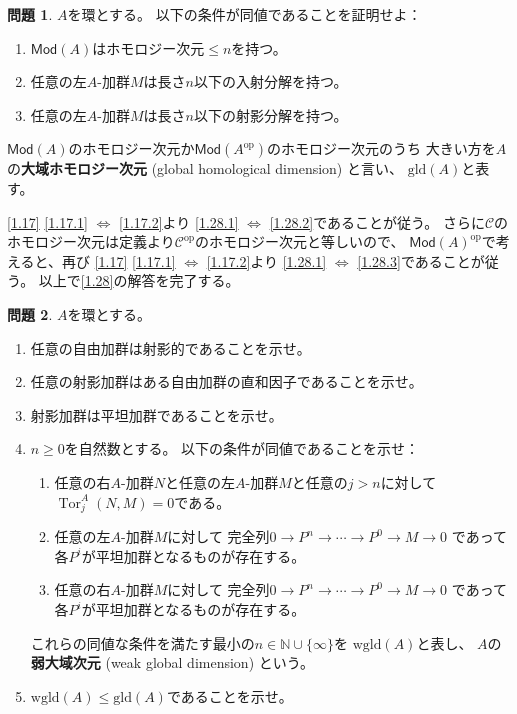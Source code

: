 \documentclass[uplatex,dvipdfmx]{jsarticle}
\makeatletter
\theoremstyle{definition}
\newtheorem{prob}[prob]{問題}
\renewenvironment{proof}[1][\proofname]{
  \pushQED{\qed}%
  \normalfont \topsep6\p@\@plus6\p@\relax
  \trivlist
  \item[\hskip\labelsep
    #1\@addpunct{\textbf{.}}]\ignorespaces
}{%
  \popQED\endtrivlist\@endpefalse
}
\providecommand{\proofname}{証明}
\newcommand{\op}{\mathrm{op}}
\DeclareMathOperator{\Tor}{\mathrm{Tor}}
\newcommand{\Mod}{\mathsf{Mod}}
\newcommand\N{\mathbb{N}}
\newcommand\mcC{\mathcal{C}}
\newcommand{\gld}{\mathrm{gld}}
\newcommand{\wgld}{\mathrm{wgld}}
\makeatother
\begin{document}
\begin{prob}\label{1.28}
  \(A\)を環とする。
  以下の条件が同値であることを証明せよ：
  \begin{enumerate}
    \item \label{1.28.1}
    \(\Mod(A)\)はホモロジー次元\(\leq n\)を持つ。
    \item \label{1.28.2}
    任意の左\(A\)-加群\(M\)は長さ\(n\)以下の入射分解を持つ。
    \item \label{1.28.3}
    任意の左\(A\)-加群\(M\)は長さ\(n\)以下の射影分解を持つ。
  \end{enumerate}
  \(\Mod(A)\)のホモロジー次元か\(\Mod(A^{\op})\)のホモロジー次元のうち
  大きい方を\(A\)の\textbf{大域ホモロジー次元}
  (global homological dimension) と言い、
  \(\gld(A)\)と表す。
\end{prob}

\begin{proof}
  \autoref{1.17} \ref{1.17.1} \(\iff\) \ref{1.17.2}より
  \ref{1.28.1} \(\iff\) \ref{1.28.2}であることが従う。
  さらに\(\mcC\)のホモロジー次元は定義より\(\mcC^{\op}\)のホモロジー次元と等しいので、
  \(\Mod(A)^{\op}\)で考えると、再び
  \autoref{1.17} \ref{1.17.1} \(\iff\) \ref{1.17.2}より
  \ref{1.28.1} \(\iff\) \ref{1.28.3}であることが従う。
  以上で\autoref{1.28}の解答を完了する。
\end{proof}




\begin{prob}\label{1.29}
  \(A\)を環とする。
  \begin{enumerate}
    \item \label{1.29.1}
    任意の自由加群は射影的であることを示せ。
    \item \label{1.29.2}
    任意の射影加群はある自由加群の直和因子であることを示せ。
    \item \label{1.29.3}
    射影加群は平坦加群であることを示せ。
    \item \label{1.29.4}
    \(n\geq 0\)を自然数とする。
    以下の条件が同値であることを示せ：
    \begin{enumerate}
      \item \label{1.29.4.1}
      任意の右\(A\)-加群\(N\)と任意の左\(A\)-加群\(M\)と任意の\(j>n\)に対して
      \(\Tor_j^A(N,M) = 0\)である。
      \item \label{1.29.4.2}
      任意の左\(A\)-加群\(M\)に対して
      完全列\(0\to P^n \to \cdots \to P^0 \to M\to 0\)
      であって各\(P^i\)が平坦加群となるものが存在する。
      \item \label{1.29.4.3}
      任意の右\(A\)-加群\(M\)に対して
      完全列\(0\to P^n \to \cdots \to P^0 \to M\to 0\)
      であって各\(P^i\)が平坦加群となるものが存在する。
    \end{enumerate}
    これらの同値な条件を満たす最小の\(n\in \N\cup\{\infty\}\)を
    \(\wgld(A)\)と表し、
    \(A\)の\textbf{弱大域次元} (weak global dimension) という。
    \item \label{1.29.5}
    \(\wgld(A) \leq \gld(A)\)であることを示せ。
  \end{enumerate}
\end{prob}
\end{document}
